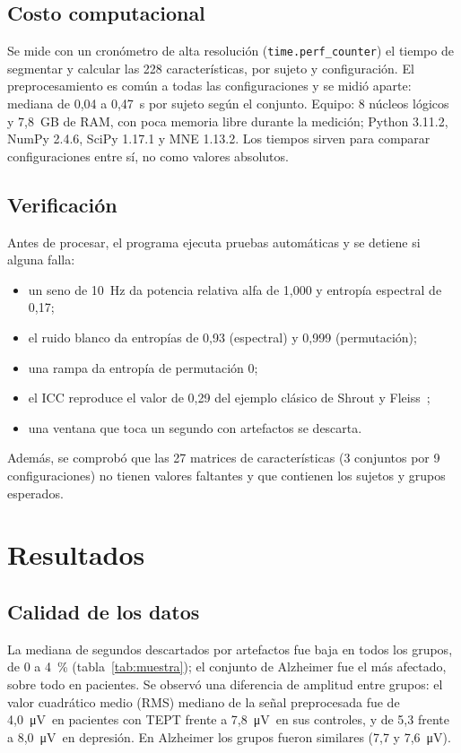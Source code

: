 \documentclass[11pt,a4paper]{article}
\newcommand{\uV}{\si{\micro\volt}}
\begin{document}
\subsection{Costo computacional}
Se mide con un cronómetro de alta resolución (\texttt{time.perf\_counter}) el tiempo de segmentar y calcular las 228 características, por sujeto y configuración. El preprocesamiento es común a todas las configuraciones y se midió aparte: mediana de 0,04 a 0,47~s por sujeto según el conjunto. Equipo: 8 núcleos lógicos y 7,8~GB de RAM, con poca memoria libre durante la medición; Python 3.11.2, NumPy 2.4.6, SciPy 1.17.1 y MNE 1.13.2. Los tiempos sirven para comparar configuraciones entre sí, no como valores absolutos.

\subsection{Verificación}
Antes de procesar, el programa ejecuta pruebas automáticas y se detiene si alguna falla:
\begin{itemize}
  \item un seno de 10~Hz da potencia relativa alfa de 1,000 y entropía espectral de 0,17;
  \item el ruido blanco da entropías de 0,93 (espectral) y 0,999 (permutación);
  \item una rampa da entropía de permutación 0;
  \item el ICC reproduce el valor de 0,29 del ejemplo clásico de Shrout y Fleiss~\cite{shrout1979};
  \item una ventana que toca un segundo con artefactos se descarta.
\end{itemize}
Además, se comprobó que las 27 matrices de características (3 conjuntos por 9 configuraciones) no tienen valores faltantes y que contienen los sujetos y grupos esperados.

\section{Resultados}

\subsection{Calidad de los datos}
La mediana de segundos descartados por artefactos fue baja en todos los grupos, de 0 a 4~\% (tabla~\ref{tab:muestra}); el conjunto de Alzheimer fue el más afectado, sobre todo en pacientes. Se observó una diferencia de amplitud entre grupos: el valor cuadrático medio (RMS) mediano de la señal preprocesada fue de 4,0~\uV\ en pacientes con TEPT frente a 7,8~\uV\ en sus controles, y de 5,3 frente a 8,0~\uV\ en depresión. En Alzheimer los grupos fueron similares (7,7 y 7,6~\uV).
\end{document}
